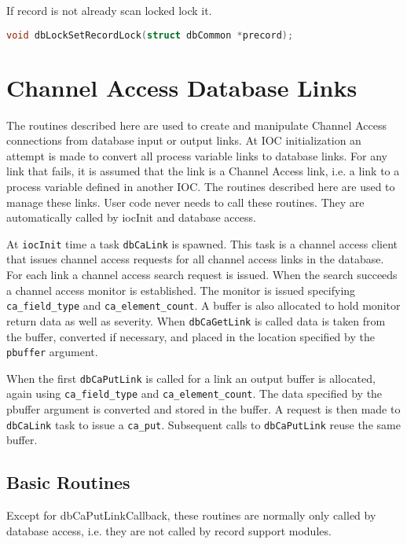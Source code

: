 If record is not already scan locked lock it.

\begin{lstlisting}[language=C]
void dbLockSetRecordLock(struct dbCommon *precord);
\end{lstlisting}

\section{Channel Access Database Links}

The routines described here are used to create and manipulate Channel Access connections from database input or output links.
At IOC initialization an attempt is made to convert all process variable links to database links.
For any link that fails, it is assumed that the link is a Channel Access link, i.e. a link to a process variable defined in another IOC.
The routines described here are used to manage these links.
User code never needs to call these routines.
They are automatically called by iocInit and database access.

At \verb|iocInit| time a task \verb|dbCaLink| is spawned.
This task is a channel access client that issues channel access requests for all channel access links in the database.
For each link a channel access search request is issued.
When the search succeeds a channel access monitor is established.
The monitor is issued specifying \verb|ca_field_type| and \verb|ca_element_count|.
A buffer is also allocated to hold monitor return data as well as severity.
When \verb|dbCaGetLink| is called data is taken from the buffer, converted if necessary, and placed in the location specified by the \verb|pbuffer| 
argument.

When the first \verb|dbCaPutLink| is called for a link an output buffer is allocated, again using \verb|ca_field_type| and \verb|ca_element_count|.
The data specified by the pbuffer argument is converted and stored in the buffer.
A request is then made to \verb|dbCaLink| task to issue a \verb|ca_put|.
Subsequent calls to \verb|dbCaPutLink| reuse the same buffer.

\subsection{Basic Routines}

Except for dbCaPutLinkCallback, these routines are normally only called by database access, i.e. they are not called by record support modules.

